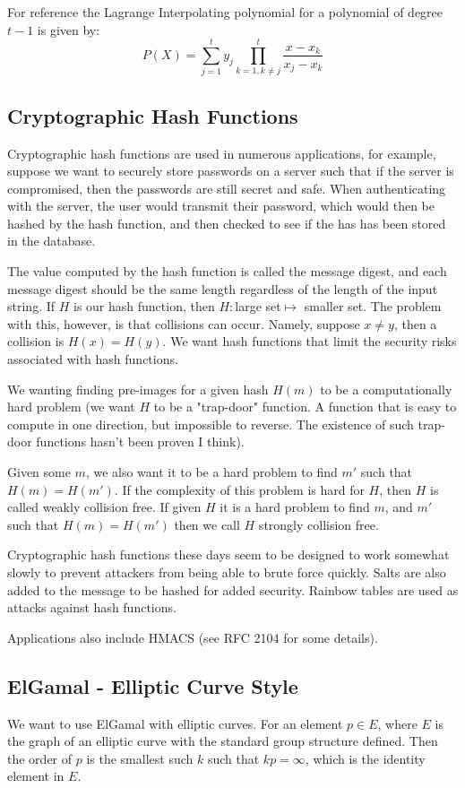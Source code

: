 \documentclass[12pt,a4paper]{article}
\begin{document}
For reference the Lagrange Interpolating polynomial for a polynomial of degree $t-1$ is given by:
\[
	P(X) = \sum_{j = 1}^{t} y_{j}\prod_{k=1, k\not=j}^{t} \frac{x - x_{k}}{x_j - x_k}
\] 

\subsection{Cryptographic Hash Functions}
Cryptographic hash functions are used in numerous applications, for example, suppose we want to securely store passwords on a server such that if the server is compromised, then the passwords are still secret and safe. When authenticating with the server, the user would transmit their password, which would then be hashed by the hash function, and then checked to see if the has has been stored in the database. 

The value computed by the hash function is called the message digest, and each message digest should be the same length regardless of the length of the input string. If $H$ is our hash function, then $H:$large set$\mapsto$ smaller set. The problem with this, however, is that collisions can occur. Namely, suppose $x\not=y$, then a collision is $H(x) = H(y)$. We want hash functions that limit the security risks associated with hash functions. 

We wanting finding pre-images for a given hash $H(m)$ to be a computationally hard problem (we want $H$ to be a "trap-door" function. A function that is easy to compute in one direction, but impossible to reverse. The existence of such trap-door functions hasn't been proven I think). 

Given some $m$, we also want it to be a hard problem to find $m'$ such that $H(m) = H(m')$. If the complexity of this problem is hard for $H$, then $H$ is called weakly collision free. If given $H$ it is a hard problem to find $m$, and $m'$ such that $H(m) = H(m')$ then we call $H$ strongly collision free. 

Cryptographic hash functions these days seem to be designed to work somewhat slowly to prevent attackers from being able to brute force quickly. Salts are also added to the message to be hashed for added security. Rainbow tables are used as attacks against hash functions. 

Applications also include HMACS (see RFC 2104 for some details). 

\subsection{ElGamal - Elliptic Curve Style}
We want to use ElGamal with elliptic curves. For an element $p \in E$, where $E$ is the graph of an elliptic curve with the standard group structure defined. Then the order of $p$ is the smallest such $k$ such that $kp = \infty$, which is the identity element in $E$. 
\end{document}
